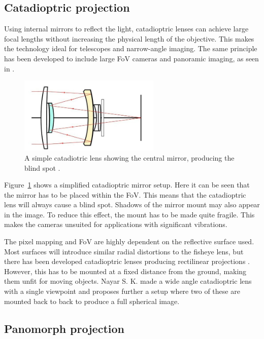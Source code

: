 \subsection{Catadioptric projection}

Using internal mirrors to reflect the light, catadioptric lenses can achieve large focal lengths without increasing the physical length of the objective. This makes the technology ideal for telescopes and narrow-angle imaging. The same principle has been developed to include large FoV cameras and panoramic imaging, as seen in \cite{CatadioptricOmni}. 

\begin{figure}[!htb]
    \centering
    \includegraphics[width=0.6\textwidth]{rapport/fig/Theory/cata.jpeg}
    \caption{A simple catadiotric lens showing the central mirror, producing the blind spot \cite{CataImage}.}
    \label{fig:theory_catadioptric_lens}
\end{figure}

Figure~\ref{fig:theory_catadioptric_lens} shows a simplified catadioptric mirror setup. Here it can be seen that the mirror has to be placed within the FoV. This means that the catadioptric lens will always cause a blind spot. Shadows of the mirror mount may also appear in the image. To reduce this effect, the mount has to be made quite fragile. This makes the cameras unsuited for applications with significant vibrations.

The pixel mapping and FoV are highly dependent on the reflective surface used. Most surfaces will introduce similar radial distortions to the fisheye lens, but there has been developed catadioptric lenses producing rectilinear projections \cite{RectilinearCatadioptric}. However, this has to be mounted at a fixed distance from the ground, making them unfit for moving objects. Nayar S. K. made a wide angle catadioptric lens \cite{CatadioptricOmni} with a single viewpoint and proposes further a setup where two of these are mounted back to back to produce a full spherical image.

\subsection{Panomorph projection}

